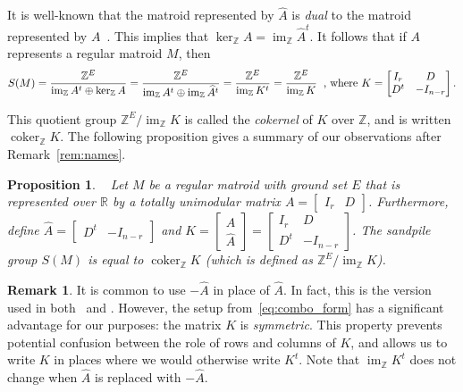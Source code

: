 \documentclass[12p]{amsart}
\numberwithin{equation}{section}
\theoremstyle{plain}
\newtheorem{prop}[thm]{Proposition}
\theoremstyle{definition}
\newtheorem{remark}[thm]{Remark}
\newcommand{\Z}{\mathbb {Z}}
\DeclareMathOperator{\im}{im}
\DeclareMathOperator{\coker}{coker}
\begin{document}
It is well-known that the matroid represented by $\widehat A$ is \emph{dual} to the matroid represented by $A$~\cite[Theorem 2.2.8]{Oxley}. This implies that $\ker_{\Z}  A = \im_{\Z} \widehat A^t$. It follows that if $A$ represents a regular matroid $M$, then 
\begin{equation}\label{eq:sandpile_def}S(M) = \frac{\Z^E}{\im_ {\Z} A^t\oplus \ker_ {\Z} A} = \frac{\Z^E}{\im_ {\Z} A^t\oplus \im_ {\Z} \widehat A^t} = \frac{\Z^E}{\im_{\Z}K^t} = \frac{\Z^E}{\im_{\Z}K}\hspace{.2 cm}\text{, where } K = \begin{bmatrix} I_r & D \\ D^t & -I_{n-r}\end{bmatrix}.\end{equation}

This quotient group $\Z^E/\im_{\Z}K$ is called the \emph{cokernel} of $K$ over $\mathbb Z$, and is written $\coker_\Z K$. The following proposition gives a summary of our observations after Remark~\ref{rem:names}. 

\begin{prop}~\cite[Definition 3.11]{Multijection}
     Let $M$ be a regular matroid with ground set $E$ that is represented over $\mathbb R$ by a totally unimodular matrix $A = \begin{bmatrix} I_r & D\end{bmatrix}$. Furthermore, define $\widehat A= \begin{bmatrix} D^t & -I_{n-r}\end{bmatrix}$ and $K = \begin{bmatrix} A \\ \widehat A\end{bmatrix} = \begin{bmatrix} I_r & D \\ D^t & -I_{n-r}\end{bmatrix}$. The \emph{sandpile group} $S(M)$ is equal to $\coker_{\mathbb Z} K$ (which is defined as $\Z^E/\im_{\Z} K$). 
\end{prop}

\begin{remark}
    It is common to use $-\widehat A$ in place of $\widehat A$. In fact, this is the version used in both~\cite[Theorem 2.2.8]{Oxley} and \cite[Definition 3.11]{Multijection}. However, the setup from~\eqref{eq:combo_form} has a significant advantage for our purposes: the matrix $K$ is \emph{symmetric}. This property prevents potential confusion between the role of rows and columns of $K$, and allows us to write $K$ in places where we would otherwise write $K^t$. Note that $\im_{\mathbb Z} K^t$ does not change when $\widehat A$ is replaced with $-\widehat A$. 
\end{remark}
\end{document}
